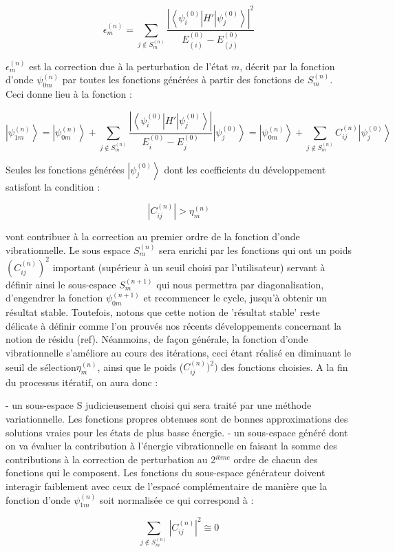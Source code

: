 \begin{equation}
	\epsilon^{(n)}_{m} =  \sum_{j \notin  S^{(n)}_{m}}  \frac{\left| \left\langle \psi^{(0)}_{i} \right| H' \left| \psi^{(0)}_{j} \right\rangle \right|^2}       {E^{(0)}_{(i)} - E^{(0)}_{(j)}}
\end{equation}

$\epsilon^{(n)}_{m}$ est la correction due à la perturbation de l'état $m$, décrit par la fonction d'onde $\psi^{(n)}_{0m}$ par toutes les fonctions générées à partir des fonctions de $S^{(n)}_{m}$.
Ceci donne lieu à la fonction :


\begin{equation}
	\left| \psi^{(n)}_{1m} \right\rangle  =  \left| \psi^{(n)}_{0m} \right\rangle + \sum_{j \notin  S^{(n)}_{m}}  \frac{| \left\langle \psi^{(0)}_{i} \right| H' \left| \psi^{(0)}_{j} \right\rangle |} {E^{(0)}_{i} - E^{(0)}_{j}}  \left| \psi^{(0)}_{j} \right\rangle = \left| \psi^{(n)}_{0m} \right\rangle  + \sum_{j \notin  S^{(n)}_{m}} C_{ij}^{(n)} \left| \psi^{(0)}_{j} \right\rangle
\end{equation}

Seules les fonctions générées $\left \vert \psi^{(0)}_{j} \right \rangle$ dont les coefficients du développement satisfont la condition :


\begin{equation}
         \left| C_{ij}^{(n)} \right| > \eta^{(n)}_{m}
\end{equation}

vont contribuer à la correction au premier ordre de la fonction d'onde vibrationnelle. Le sous espace $S^{(n)}_{m}$ sera enrichi par les fonctions qui ont un poids $(C_{ij}^{(n)})^2$ important (supérieur à un seuil choisi par l'utilisateur) servant à définir ainsi le sous-espace $S^{(n+1)}_{m}$ qui nous permettra par diagonalisation, d'engendrer la fonction $\psi^{(n+1)}_{0m}$ et recommencer le cycle, jusqu'à obtenir un résultat stable. Toutefois, notons que cette notion de 'résultat stable' reste délicate à définir comme l'on prouvés nos récents développements concernant la notion de résidu (ref). Néanmoins, de façon générale, la fonction d'onde vibrationnelle s'améliore au cours des itérations, ceci étant réalisé en diminuant le seuil de sélection$\eta^{(n)}_{m}$, ainsi que le poids ($C_{ij}^{(n)})^2)$ des fonctions choisies. A la fin du processus itératif, on aura donc :

- un sous-espace S judicieusement choisi qui sera traité par une méthode variationnelle. Les fonctions propres obtenues sont de bonnes approximations des solutions vraies pour les états de plus basse énergie.
- un sous-espace généré dont on va évaluer la contribution à l'énergie vibrationnelle en faisant la somme des contributions à la correction de perturbation au 2$^{ième}$ ordre de chacun des fonctions qui le composent. Les fonctions du sous-espace générateur doivent interagir faiblement avec ceux de l'espacé complémentaire de manière que la fonction d'onde $\psi^{(n)}_{1m}$ soit normalisée ce qui correspond à :

\begin{equation}
	 \sum_{j \notin  S^{(n)}_{m}}  \left| C_{ij}^{(n)} \right|^2  \cong 0
\end{equation}



 








